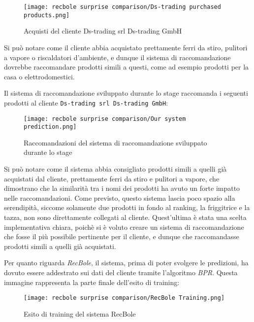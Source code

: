 \begin{figure}[h]
    \centering
    \texttt{[image: recbole surprise comparison/Ds-trading purchased products.png]}
    \caption{Acquisti del cliente Ds-trading srl Ds-trading GmbH}
    \label{fig:recbole-surprise-orders-export}
\end{figure}

Si può notare come il cliente abbia acquistato prettamente ferri da stiro, pulitori a vapore o riscaldatori d'ambiente, e dunque il sistema di raccomandazione dovrebbe raccomandare prodotti simili a questi, come ad esempio prodotti per la casa o elettrodomestici.

Il sistema di raccomandazione sviluppato durante lo stage raccomanda i seguenti prodotti al cliente \texttt{Ds-trading srl Ds-trading GmbH}:

\begin{figure}[h]
    \centering
    \texttt{[image: recbole surprise comparison/Our system prediction.png]}
    \caption{Raccomandazioni del sistema di raccomandazione sviluppato durante lo stage}
    \label{fig:our-system-recommendations}
\end{figure}

Si può notare come il sistema abbia consigliato prodotti simili a quelli già acquistati dal cliente, prettamente ferri da stiro e pulitori a vapore, che dimostrano che la similarità tra i nomi dei prodotti ha avuto un forte impatto nelle raccomandazioni. Come previsto, questo sistema lascia poco spazio alla serendipità, siccome solamente due prodotti in fondo al ranking, la friggitrice e la tazza, non sono direttamente collegati al cliente. Quest'ultima è stata una scelta implementativa chiara, poichè si è voluto creare un sistema di raccomandazione che fosse il più possibile pertinente per il cliente, e dunque che raccomandasse prodotti simili a quelli già acquistati.

Per quanto riguarda \emph{RecBole}, il sistema, prima di poter svolgere le predizioni, ha dovuto essere addestrato sui dati del cliente tramite l'algoritmo \emph{BPR}. Questa immagine rappresenta la parte finale dell'esito di training:

\begin{figure}[h]
    \centering
    \texttt{[image: recbole surprise comparison/RecBole Training.png]}
    \caption{Esito di training del sistema RecBole}
    \label{fig:recbole-training-outcome}
\end{figure}

